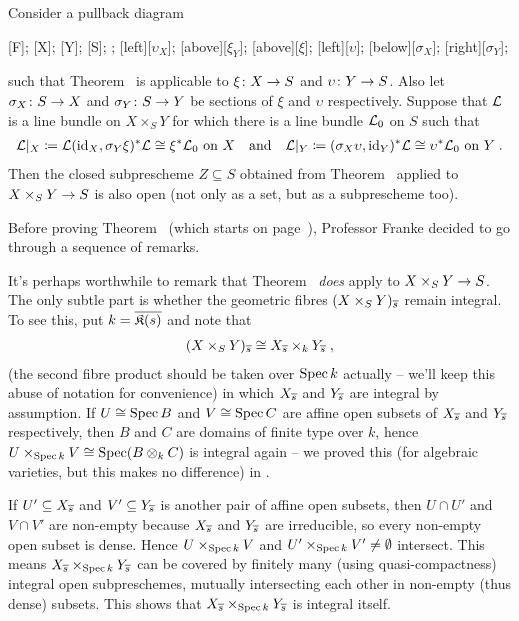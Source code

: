 \documentclass[a4paper,parskip=half,numbers=enddot, DIV=12]{scrreprt}
\begin{document}
\begin{thm}
	Consider a pullback diagram
	\begin{diagram*}
		[F];
		[X];
		[Y];
		[S];
		;
		\scriptsize
		[$\upsilon_X$];
		[above][$\xi_Y$];
		[above][$\xi$];
		[$\upsilon$];
		[below][$\sigma_X$];
		[right][$\sigma_Y$];
	\end{diagram*}
	 such that Theorem~ is applicable to $\xi\colon X\morphism S$ and $\upsilon\colon Y\morphism S$. Also let $\sigma_X\colon S\morphism X$ and $\sigma_Y\colon S\morphism Y$ be sections of $\xi$ and $\upsilon$ respectively. Suppose that $\mathcal{L}$ is a line bundle on $X\times_SY$ for which there is a line bundle $\mathcal{L}_0$ on $S$ such that
	 \begin{align*}
	 	\mathcal{L}|_X\coloneqq\mathcal{L}(\operatorname{id}_X,\sigma_Y\xi)^*\mathcal{L}\cong \xi^*\mathcal{L}_0\text{ on }X\quad\text{and}\quad\mathcal{L}|_Y\coloneqq(\sigma_X\upsilon,\operatorname{id}_Y)^*\mathcal{L}\cong \upsilon^*\mathcal{L}_0\text{ on }Y\;.
	 \end{align*}
	 Then the closed subprescheme $Z\subseteq S$ obtained from Theorem~ applied to $X\times_SY\morphism S$ is also open (not only as a set, but as a subprescheme too).
\end{thm}
Before proving Theorem~ (which starts on page~\pageref{proof:cube}), Professor Franke decided to go through a sequence of remarks.
\begin{rem}
	It's perhaps worthwhile to remark that Theorem~ \emph{does} apply to $X\times_SY\morphism S$. The only subtle part is whether the geometric fibres $(X\times_SY)_{\overline{s}}$ remain integral. To see this, put $k=\overline{\mathfrak{K}(s)}$ and note that
	\begin{align*}
		(X\times_SY)_{\overline{s}}\cong X_{\overline{s}}\times_kY_{\overline{s}}\;,
	\end{align*}
	(the second fibre product should be taken over $\operatorname{Spec} k$ actually -- we'll keep this abuse of notation for convenience) in which $X_{\overline{s}}$ and $Y_{\overline{s}}$ are integral by assumption. If $U\cong \operatorname{Spec} B$ and $V\cong \operatorname{Spec} C$ are affine open subsets of $X_{\overline{s}}$ and $Y_{\overline{s}}$ respectively, then $B$ and $C$ are domains of finite type over $k$, hence $U\times_{\operatorname{Spec} k}V\cong \operatorname{Spec} (B\otimes_kC)$ is integral again -- we proved this (for algebraic varieties, but this makes no difference) in \cite[Proposition~2.2.6]{alg1}.
	
	If $U'\subseteq X_{\overline{s}}$ and $V'\subseteq Y_{\overline{s}}$ is another pair of affine open subsets, then $U\cap U'$ and $V\cap V'$ are non-empty because $X_{\overline{s}}$ and $Y_{\overline{s}}$ are irreducible, so every non-empty open subset is dense. Hence $U\times_{\operatorname{Spec} k}V$ and $U'\times_{\operatorname{Spec} k}V'\neq \emptyset$ intersect. This means $X_{\overline{s}}\times_{\operatorname{Spec} k}Y_{\overline{s}}$ can be covered by finitely many (using quasi-compactness) integral open subpreschemes, mutually intersecting each other in non-empty (thus dense) subsets. This shows that $X_{\overline{s}}\times_{\operatorname{Spec} k}Y_{\overline{s}}$ is integral itself.
\end{rem}
\end{document}
